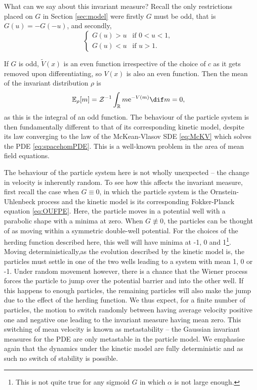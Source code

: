         What can we say about this invariant measure? Recall the only restrictions placed on $G$ in Section \ref{sec:model} were firstly $G$ must be odd, that is $G(u)=-G(-u)$, and secondly,
        \[
            \begin{cases}
            G(u)>u & \text{if } 0<u<1,\\ 
            G(u)<u &  \text{if } u>1.
            \end{cases}
        \]
         
        If $G$ is odd, $\tilde{V}(x)$ is an even function irrespective of the choice of $c$ as it gets removed upon differentiating, so $V(x)$ is also an even function. Then the mean of the invariant distribution $\rho$ is
        \[
            \mathbb{E}_{\rho}[m] = \mathcal{Z}^{-1}\int_{\mathbb{R}} m \mathrm{e}^{-V(m)}\dif m = 0,
        \]
        as this is the integral of an odd function. The behaviour of the particle system is then fundamentally different to that of its corresponding kinetic model, despite its law converging to the law of the McKean-Vlasov SDE \eqref{eq:McKV} which solves the PDE \eqref{eq:spacehomPDE}. This is a well-known problem in the area of mean field equations.
        
    The behaviour of the particle system here is not wholly unexpected -- the change in velocity is inherently random. To see how this affects the invariant measure, first recall the case when $G\equiv 0$, in which the particle system is the Ornstein-Uhlenbeck process and the kinetic model is its corresponding Fokker-Planck equation \eqref{eq:OUFPE}. Here, the particle moves in a potential well with a parabolic shape with a minima at zero. When $G\not\equiv 0$, the particles can be thought of as moving within a symmetric double-well potential. For the choices of the herding function described here, this well will have minima at -1, 0 and 1\footnote{This is not quite true for any sigmoid $G$ in which $\alpha$ is not large enough.}. Moving deterministically,as the evolution described by the kinetic model is, the particles must settle in one of the two wells leading to a system with mean 1, 0 or -1. Under random movement however, there is a chance that the Wiener process forces the particle to jump over the potential barrier and into the other well. If this happens to enough particles, the remaining particles will also make the jump due to the effect of the herding function. We thus expect, for a finite number of particles, the motion to switch randomly between having average velocity positive one and negative one leading to the invariant measure having mean zero. This switching of mean velocity is known as metastability -- the Gaussian invariant measures for the PDE are only metastable in the particle model. We emphasise again that the dynamics under the kinetic model are fully deterministic and as such no switch of stability is possible.
        
